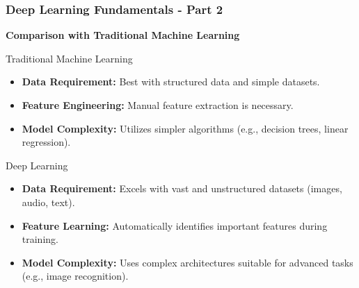 \documentclass[aspectratio=169]{beamer}
\begin{document}
\begin{frame}[fragile]
    \frametitle{Deep Learning Fundamentals - Part 2}
    \textbf{Comparison with Traditional Machine Learning}
    
    \begin{block}{Traditional Machine Learning}
        \begin{itemize}
            \item \textbf{Data Requirement:} Best with structured data and simple datasets.
            \item \textbf{Feature Engineering:} Manual feature extraction is necessary.
            \item \textbf{Model Complexity:} Utilizes simpler algorithms (e.g., decision trees, linear regression).
        \end{itemize}
    \end{block}

    \begin{block}{Deep Learning}
        \begin{itemize}
            \item \textbf{Data Requirement:} Excels with vast and unstructured datasets (images, audio, text).
            \item \textbf{Feature Learning:} Automatically identifies important features during training.
            \item \textbf{Model Complexity:} Uses complex architectures suitable for advanced tasks (e.g., image recognition).
        \end{itemize}
    \end{block}
\end{frame}
\end{document}
